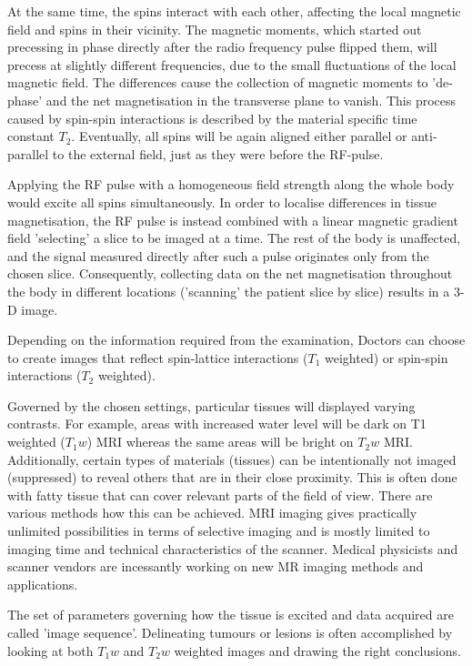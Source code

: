 At the same time, the spins interact with each other, affecting the local magnetic field and spins in their vicinity.
The magnetic moments, which started out precessing in phase directly after the radio frequency pulse flipped them, will precess at slightly different frequencies, due to the small fluctuations of the local magnetic field.
The differences cause the collection of magnetic moments to 'de-phase' and the net magnetisation in the transverse plane to vanish.
This process caused by spin-spin interactions is described by the material specific time constant $T_2$.
Eventually, all spins will be again aligned either parallel or anti-parallel to the external field, just as they were before the RF-pulse.

Applying the RF pulse with a homogeneous field strength along the whole body would excite all spins simultaneously.
In order to localise differences in tissue magnetisation, the RF pulse is instead combined with a linear magnetic gradient field 'selecting' a slice to be imaged at a time.
The rest of the body is unaffected, and the signal measured directly after such a pulse originates only from the chosen slice.
Consequently, collecting data on the net magnetisation throughout the body in different locations ('scanning' the patient slice by slice) results in a 3-D image.

Depending on the information required from the examination, Doctors can choose to create images that reflect spin-lattice interactions ($T_1$ weighted) or spin-spin interactions ($T_2$ weighted).

Governed by the chosen settings, particular tissues will displayed varying contrasts.
For example, areas with increased water level will be dark on T1 weighted ($T_1w$) MRI whereas the same areas will be bright on $T_2w$ MRI.
Additionally, certain types of materials (tissues) can be intentionally not imaged (suppressed) to reveal others that are in their close proximity.
This is often done with fatty tissue that can cover relevant parts of the field of view.
There are various methods how this can be achieved.
MRI imaging gives practically unlimited possibilities in terms of selective imaging and is mostly limited to imaging time and technical characteristics of the scanner.
Medical physicists and scanner vendors are incessantly working on new MR imaging methods and applications. 

The set of parameters governing how the tissue is excited and data acquired are called 'image sequence'.
Delineating tumours or lesions is often accomplished by looking at both $T_1w$ and $T_2w$ weighted images and drawing the right conclusions.

